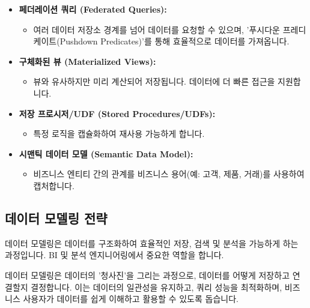\documentclass[11pt,a4paper]{article}
\begin{document}
\begin{itemize}
\begin{itemize}
    \end{itemize}
    \item \textbf{페더레이션 쿼리 (Federated Queries):}
    \begin{itemize}
        \item 여러 데이터 저장소 경계를 넘어 데이터를 요청할 수 있으며, '푸시다운 프레디케이트(Pushdown Predicates)'를 통해 효율적으로 데이터를 가져옵니다.
    \end{itemize}
    \item \textbf{구체화된 뷰 (Materialized Views):}
    \begin{itemize}
        \item 뷰와 유사하지만 미리 계산되어 저장됩니다. 데이터에 더 빠른 접근을 지원합니다.
    \end{itemize}
    \item \textbf{저장 프로시저/UDF (Stored Procedures/UDFs):}
    \begin{itemize}
        \item 특정 로직을 캡슐화하여 재사용 가능하게 합니다.
    \end{itemize}
    \item \textbf{시맨틱 데이터 모델 (Semantic Data Model):}
    \begin{itemize}
        \item 비즈니스 엔티티 간의 관계를 비즈니스 용어(예: 고객, 제품, 거래)를 사용하여 캡처합니다.
    \end{itemize}
\end{itemize}

\subsection{데이터 모델링 전략}
데이터 모델링은 데이터를 구조화하여 효율적인 저장, 검색 및 분석을 가능하게 하는 과정입니다. BI 및 분석 엔지니어링에서 중요한 역할을 합니다.

\begin{tcolorbox}[mybox={핵심 요약: 데이터의 청사진}]
데이터 모델링은 데이터의 '청사진'을 그리는 과정으로, 데이터를 어떻게 저장하고 연결할지 결정합니다. 이는 데이터의 일관성을 유지하고, 쿼리 성능을 최적화하며, 비즈니스 사용자가 데이터를 쉽게 이해하고 활용할 수 있도록 돕습니다.
\end{tcolorbox}
\end{document}
